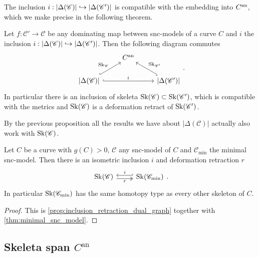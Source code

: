 The inclusion $i: |\Delta(\mathscr C)| \hookrightarrow |\Delta(\mathscr C')|$ is compatible with the embedding into $C{}^{\text{an}}$, which we make precise in the following theorem. 
\begin{proposition}
	Let $f:\mathscr C' \to \mathscr C$ be any dominating map between snc-models of a curve $C$ and $i$ the inclusion $i: |\Delta(\mathscr C)| \hookrightarrow |\Delta(\mathscr C')|$. 
	Then the following diagram commutes \[
	\begin{tikzcd}
		& C\an \\
		{|\Delta(\mathscr C)|} \ar[hookrightarrow]{ur}{\sk_{\mathscr C}}
\ar[hookrightarrow]{rr}{i} & & {|\Delta(\mathscr C')|} \ar[hookrightarrow]{ul}[']{\sk_{\mathscr C'}}
	\end{tikzcd}
	.\] 
	In particular there is an inclusion of skeleta $\operatorname{Sk}(\mathscr C) \subset  \operatorname{Sk}(\mathscr C')$, which is compatible with the metrics and $\operatorname{Sk}(\mathscr C)$ is a deformation retract of  $\operatorname{Sk}(\mathscr C')$. 
\end{proposition}

By the previous proposition all the results we have about $|\Delta(\mathscr C)|$ actually also work with  $\operatorname{Sk}(\mathscr C)$. 

\begin{corollary}
	Let $C$ be a curve with  $g(C) > 0$, $\mathscr C$ any snc-model of $C$ and $\mathscr C_\text{min} $ the minimal snc-model. 
	Then there is an isometric inclusion $i$ and deformation retraction $r$
\[
\begin{tikzcd}
	\sk(\mathscr C ) \rar[hookleftarrow, shift left]{i} \rar[twoheadrightarrow, shift right, ']{r} & \sk(\mathscr C_\text{min} ) 
\end{tikzcd}
.\] 
In particular $\operatorname{Sk}(\mathscr C_\text{min} )$ has the same homotopy type as every other skeleton of $C$. 
\end{corollary}
\begin{proof}
	This is \cref{prop:inclusion_retraction_dual_graph} together with \cref{thm:minimal_snc_model}.
\end{proof}

\subsection{Skeleta span $C^{\mathrm{an}}$} \label{sec:skeleta_span_C_an}

